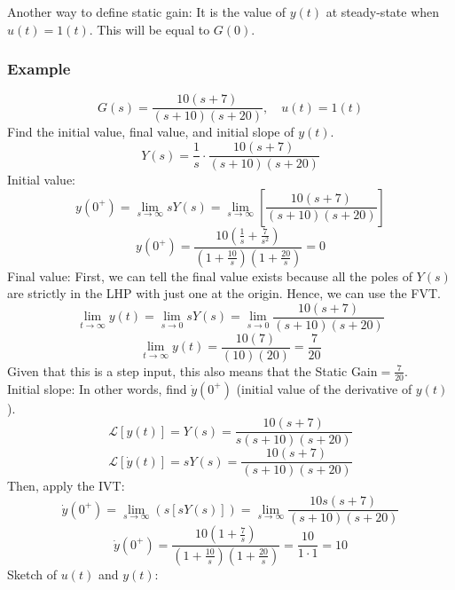 \documentclass{book}
\newcommand{\LT}{\mathcal{L}}
\newcommand{\exmp}{\subsubsection*{Example}}
\begin{document}
Another way to define static gain: It is the value of $ y(t) $ at steady-state when $ u(t)=1(t) $. This will be equal to $ G(0) $.

\exmp
\[ G(s) = \frac{10(s+7)}{(s+10)(s+20)},\quad u(t)=1(t) \]
Find the initial value, final value, and initial slope of $ y(t) $.
\[ Y(s) = \frac{1}{s}\cdot\frac{10(s+7)}{(s+10)(s+20)} \]
Initial value:
\[ y(0^+) = \lim_{s\to\infty}  sY(s) = \lim_{s\to\infty} \left[ \frac{10(s+7)}{(s+10)(s+20)} \right] \]
\[ y(0^+) = \frac{10\left(\frac{1}{s}+\frac{7}{s^2}\right)}{\left(1+\frac{10}{s}\right)\left(1+\frac{20}{s}\right)} = 0 \]
Final value: First, we can tell the final value exists because all the poles of $ Y(s) $ are strictly in the LHP with just one at the origin. Hence, we can use the FVT.
\[ \lim_{t\to\infty}y(t) = \lim_{s\to0} sY(s) = \lim_{s\to0} \frac{10(s+7)}{(s+10)(s+20)} \]
\[ \lim_{t\to\infty}y(t) = \frac{10(7)}{(10)(20)} = \frac{7}{20} \]
Given that this is a step input, this also means that the Static Gain$ = \frac{7}{20} $.\\
Initial slope: In other words, find $ \dot{y}(0^+) $ (initial value of the derivative of $ y(t) $).
\[ \LT[y(t)] = Y(s) = \frac{10(s+7)}{s(s+10)(s+20)} \]
\[ \LT[\dot{y}(t)] = sY(s) = \frac{10(s+7)}{(s+10)(s+20)} \]
Then, apply the IVT:
\[ \dot{y}(0^+) = \lim_{s\to\infty} (s[sY(s)]) = \lim_{s\to\infty} \frac{10s(s+7)}{(s+10)(s+20)} \]
\[ \dot{y}(0^+) = \frac{10\left(1+\frac{7}{s}\right)}{\left(1+\frac{10}{s}\right)\left(1+\frac{20}{s}\right)} = \frac{10}{1\cdot1} = 10 \]
Sketch of $ u(t) $ and $ y(t) $:
\begin{center}
\end{center}
\end{document}
